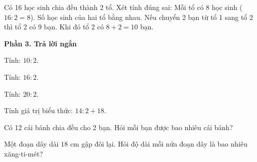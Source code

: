 \begin{ex} %
Có 16 học sinh chia đều thành 2 tổ. Xét tính đúng sai:
\choiceTF
{\True Mỗi tổ có 8 học sinh ($16 : 2 = 8$).}
{\True Số học sinh của hai tổ bằng nhau.}
{Nếu chuyển 2 bạn từ tổ 1 sang tổ 2 thì tổ 2 có 9 bạn.}
{\True Khi đó tổ 2 có $8 + 2 = 10$ bạn.}
\end{ex}

\textbf{Phần 3. Trả lời ngắn}

\begin{ex} %
Tính: $10 : 2$.
\end{ex}

\begin{ex} %
Tính: $16 : 2$.
\end{ex}

\begin{ex} %
Tính: $20 : 2$.
\end{ex}

\begin{ex} %
Tính giá trị biểu thức: $14 : 2 + 18$.
\end{ex}

\begin{ex} %
Có 12 cái bánh chia đều cho 2 bạn. Hỏi mỗi bạn được bao nhiêu cái bánh?
\end{ex}

\begin{ex} %
Một đoạn dây dài $18\text{ cm}$ gập đôi lại. Hỏi độ dài mỗi nửa đoạn dây là bao nhiêu xăng-ti-mét?
\end{ex}

